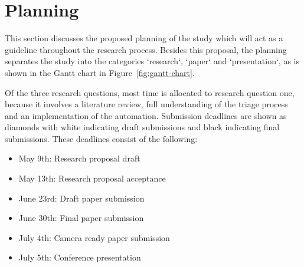 \section{Planning}
\label{sec:planning}

This section discusses the proposed planning of the study which will act as a guideline throughout the research process.
Besides this proposal, the planning separates the study into the categories `research`, `paper` and `presentation`,
as is shown in the Gantt chart in Figure\ \ref{fig:gantt-chart}.

Of the three research questions, most time is allocated to research question one, because it involves a literature
review, full understanding of the triage process and an implementation of the automation.
Submission deadlines are shown as diamonds with white indicating draft submissions and black indicating final
submissions.
These deadlines consist of the following:

\begin{itemize}
    \item May 9th: Research proposal draft
    \item May 13th: Research proposal acceptance
    \item June 23rd: Draft paper submission
    \item June 30th: Final paper submission
    \item July 4th: Camera ready paper submission
    \item July 5th: Conference presentation
\end{itemize}




\newcount\off\off\startdow\multiply{}\advance{}
\ifnum{}
\else
    \if{}
    \else
    \fi
\fi

